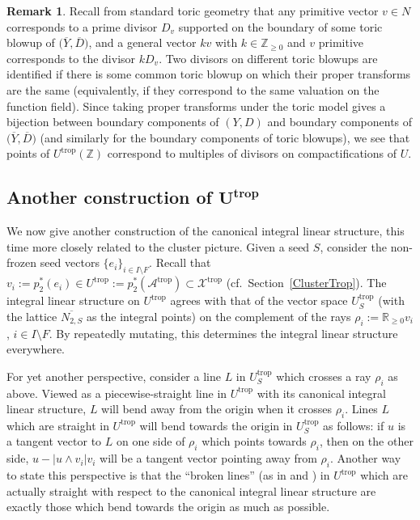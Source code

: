 \documentclass[10pt,a4paper]{amsart}
\numberwithin{equation}{section}
\numberwithin{figure}{section}
\numberwithin{table}{section}
\DeclareMathOperator{\trop}{trop}
\let\?=\overline
\let\bb=\mathbb
\let\s=\mathcal
\theoremstyle{definition}
\newtheorem{rmk}[thm]{Remark}
\begin{document}
\begin{rmk}\label{divisorial} Recall from standard toric geometry that any primitive vector $v\in N$ corresponds to a prime divisor $D_v$ supported on the boundary of some toric blowup of $\big(\?{Y},\?{D}\big)$, and a general vector $kv$ with $k\in \bb{Z}_{\geq 0}$ and $v$ primitive corresponds to the divisor $kD_{v}$. Two divisors on different toric blowups are identified if there is some common toric blowup on which their proper transforms are the same (equivalently, if they correspond to the same valuation on the function field). Since taking proper transforms under the toric model gives a bijection between boundary components of $(Y,D)$ and boundary components of $\big(\?{Y},\?{D}\big)$ (and similarly for the boundary components of toric blowups), we see that points of $U^{\trop}(\bb{Z})$ correspond to multiples of divisors on compactifications of $U$.
\end{rmk}

\subsection[Another construction of $U^{\trop}$]{Another construction of $\boldsymbol{U^{\trop}}$}\label{SeedScatter}
We now give another construction of the canonical integral linear structure, this time more closely related to the cluster picture. Given a seed $S$, consider the non-frozen seed vectors $\{e_i\}_{i\in I\setminus F}$. Recall that $v_i:=p_2^*(e_i) \in U^{\trop}:=p_2^*(\s{A}^{\trop})\subset \s{X}^{\trop}$ (cf.\ Section~\ref{ClusterTrop}). The integral linear structure on $U^{\trop}$ agrees with that of the vector space $U^{\trop}_S$ (with the lattice $\?{N_{2,S}}$ as the integral points) on the complement of the rays $\rho_i:=\bb{R}_{\geq 0} v_i$, $i\in I\setminus F$. By repeatedly mutating, this determines the integral linear structure everywhere.

For yet another perspective, consider a line $L$ in $U^{\trop}_S$ which crosses a ray $\rho_i$ as above. Viewed as a piecewise-straight line in $U^{\trop}$ with its canonical integral linear structure, $L$ will bend away from the origin when it crosses $\rho_i$. Lines $L$ which are straight in $U^{\trop}$ will bend towards the origin in $U^{\trop}_S$ as follows: if $u$ is a tangent vector to $L$ on one side of $\rho_i$ which points towards $\rho_i$, then on the other side, $u-|u\wedge v_i| v_i$ will be a tangent vector pointing away from $\rho_i$.
 Another way to state this perspective is that the ``broken lines'' (as in \cite{GHK1} and \cite{GHKK}) in $U^{\trop}$ which are actually straight with respect to the canonical integral linear structure are exactly those which bend towards the origin as much as possible.
\end{document}
